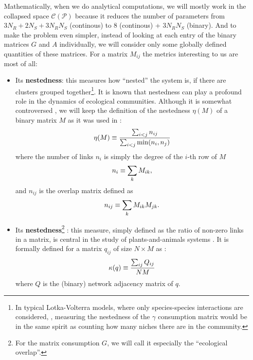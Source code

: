 \documentclass[12pt, titlepage]{report}
\begin{document}
Mathematically, when we do analytical computations, we will mostly work in the collapsed space $\mathcal{C}(\mathcal{P})$ because it reduces the number of parameters from $3N_R+2N_S+3N_RN_S$ (continous) to $8$ (continous) + $3N_RN_S$ (binary). And to make the problem even simpler, instead of looking at each entry of the binary matrices $G$ and $A$ individually, we will consider only some globally defined quantities of these matrices. For a matrix $M_{ij}$ the metrics interesting to us are most of all:
\begin{itemize}
\item Its \textbf{nestedness}: this measures how ``nested'' the system is, \ie if there are clusters grouped together\footnote{In typical Lotka-Volterra models, where only species-species interactions are considered, \eg \cite{iannelli_introduction_2014}, measuring the nestedness of the $\gamma$ consumption matrix would be in the same spirit as counting how many niches there are in the community.}. It is known \cite{bastolla_architecture_2009, pascual-garcia_mutualism_2017} that nestedness can play a profound role in the dynamics of ecological communities. Although it is somewhat controversed \cite{jonhson_factors_2013}, we will keep the definition of the nestedness $\eta(M)$ of a binary matrix $M$ as it was used in \cite{bastolla_architecture_2009}:
\begin{equation}
\eta(M)\equiv \frac{\sum_{i<j} n_{ij}}{\sum_{i < j} \min(n_i, n_j)}
\end{equation}
where the number of links $n_i$ is simply the degree of the $i$-th row of $M$
\begin{equation}
n_i \equiv \sum_k M_{ik},
\end{equation}
and $n_{ij}$ is the overlap matrix defined as
\begin{equation}
n_{ij}\equiv \sum_k M_{ik}M_{jk}.
\end{equation}

\item Its \textbf{nestedness}\footnote{For the matrix consumption $G$, we will call it especially the ``ecological overlap''.} : this measure, simply defined as the ratio of non-zero links in a matrix, is central in the study of plants-and-animals systems \cite{pascual-garcia_mutualism_2017}. It is formally defined for a matrix $q_{ij}$  of size $N\times M$ as :
\begin{equation}
\kappa(q)\equiv \frac{\sum_{ij} Q_{ij}}{NM}
\end{equation}
where $Q$ is the (binary) network adjacency matrix of $q$.
\end{itemize}
\end{document}

